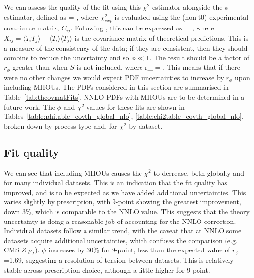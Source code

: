 We can assess the quality of the fit using this $\chi^2$ estimator alongside the $\phi$ estimator, defined as
\be 
\phi = ,
\ee
where $\chi^2_{exp}$ is evaluated using the (non-t0) experimental covariance matrix, $C_{ij}$. Following \cite{Ball:2014uwa}, this can be expressed as
\be 
\phi = ,
\ee
where $X_{ij} = \langle T_i T_j \rangle - \langle T_i \rangle \langle T_j \rangle$ is the covariance matrix of theoretical predictions. This is a measure of the consistency of the data; if they are consistent, then they should combine to reduce the uncertainty and so $\phi \ll 1$. The result should be a factor of $r_{\phi}$ greater than when $S$ is not included, where
\be
r_{\phi} = .
\ee
This means that if there were no other changes we would expect PDF uncertainties to increase by $r_{\phi}$ upon including MHOUs. 
The PDFs considered in this section are summarised in Table~\ref{tab:thcovmatFits}. NNLO PDFs with MHOUs are to
be determined in a future work. The $\phi$ and $\chi^2$ values
for these fits are shown in Tables~\ref{table:phitable_covth_global_nlo}, \ref{table:chi2table_covth_global_nlo}, broken down by process type and, for $\chi^2$ by dataset.
  
  
  

\subsection{Fit quality}
We can see that including MHOUs causes the $\chi^2$ to decrease, both globally and for many individual datasets. This is an indication that the fit quality has improved, and is to be expected as we have added additional uncertainties. This varies slightly by prescription, with 9-point showing the greatest improvement, down 3\%, which is comparable to the NNLO value. This suggests that the theory uncertainty is doing a reasonable job of accounting for the NNLO correction. Individual datasets follow a similar trend, with the caveat that at NNLO some datasets acquire additional uncertainties, which confuses the comparison (e.g. CMS $Z$ $p_{T}$). $\phi$ increases by 30\% for 9-point, less than the expected value of $r_\phi$=1.69, suggesting a resolution of tension between datasets. This is relatively stable across prescription choice, although a little higher for 9-point. 


